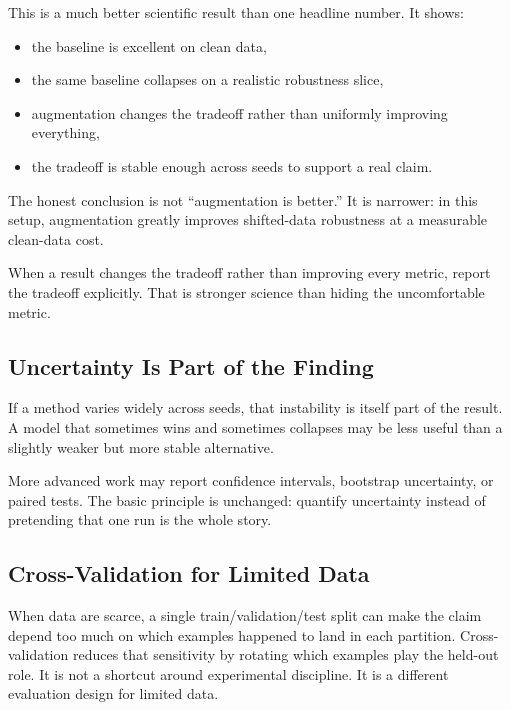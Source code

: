 This is a much better scientific result than one headline number. It shows:
\begin{itemize}[leftmargin=*]
\item the baseline is excellent on clean data,
\item the same baseline collapses on a realistic robustness slice,
\item augmentation changes the tradeoff rather than uniformly improving everything,
\item the tradeoff is stable enough across seeds to support a real claim.
\end{itemize}

The honest conclusion is not ``augmentation is better.'' It is narrower: in this setup, augmentation greatly improves shifted-data robustness at a measurable clean-data cost.

\begin{evidencebox}
When a result changes the tradeoff rather than improving every metric, report the tradeoff explicitly. That is stronger science than hiding the uncomfortable metric.
\end{evidencebox}

\subsection{Uncertainty Is Part of the Finding}

If a method varies widely across seeds, that instability is itself part of the result. A model that sometimes wins and sometimes collapses may be less useful than a slightly weaker but more stable alternative.

\begin{advancednote}
More advanced work may report confidence intervals, bootstrap uncertainty, or paired tests. The basic principle is unchanged: quantify uncertainty instead of pretending that one run is the whole story.
\end{advancednote}

\subsection{Cross-Validation for Limited Data}

When data are scarce, a single train/validation/test split can make the claim depend too much on which examples happened to land in each partition. Cross-validation reduces that sensitivity by rotating which examples play the held-out role. It is not a shortcut around experimental discipline. It is a different evaluation design for limited data.

